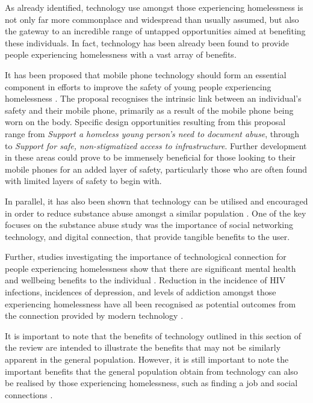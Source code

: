As already identified, technology use amongst those experiencing homelessness is not only far more commonplace and widespread than usually assumed, but also the gateway to an incredible range of untapped opportunities aimed at benefiting these individuals. In fact, technology has been already been found to provide people experiencing homelessness with a vast array of benefits.

It has been proposed that mobile phone technology should form an essential component in efforts to improve the safety of young people experiencing homelessness \cite{woelfer2011improving}. The proposal recognises the intrinsic link between an individual's safety and their mobile phone, primarily as a result of the mobile phone being worn on the body. Specific design opportunities resulting from this proposal range from \emph{Support a homeless young person’s need to document abuse}, through to \emph{Support for safe, non-stigmatized access to infrastructure}. Further development in these areas could prove to be immensely beneficial for those looking to their mobile phones for an added layer of safety, particularly those who are often found with limited layers of safety to begin with.

In parallel, it has also been shown that technology can be utilised and encouraged in order to reduce substance abuse amongst a similar population \cite{rice2011social}. One of the key focuses on the substance abuse study was the importance of social networking technology, and digital connection, that provide tangible benefits to the user.

Further, studies investigating the importance of technological connection for people experiencing homelessness show that there are significant mental health and wellbeing benefits to the individual \cite{rice2011social} \cite{eyrich2010mobile} \cite{roberson2010survival}. Reduction in the incidence of HIV infections, incidences of depression, and levels of addiction amongst those experiencing homelessness have all been recognised as potential outcomes from the connection provided by modern technology \cite{sala2014benefits}.

It is important to note that the benefits of technology outlined in this section of the review are intended to illustrate the benefits that may not be similarly apparent in the general population. However, it is still important to note the important benefits that the general population obtain from technology can also be realised by those experiencing homelessness, such as finding a job and social connections \cite{le2008feature}.

